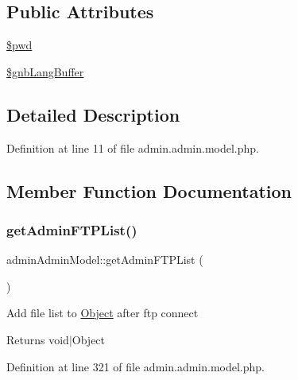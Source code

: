 \subsection*{Public Attributes}
\begin{DoxyCompactItemize}
\item 
\hyperlink{classadminAdminModel_a0c3f3a9ef22f7f5b6ed159a11d8d8e45}{\$pwd}
\item 
\hyperlink{classadminAdminModel_acd5e0dd59b6eb5c0df5638247797c799}{\$gnb\+Lang\+Buffer}
\end{DoxyCompactItemize}


\subsection{Detailed Description}


Definition at line 11 of file admin.\+admin.\+model.\+php.



\subsection{Member Function Documentation}
\hypertarget{classadminAdminModel_a9e944aba1586e011811993745738728e}{}\label{classadminAdminModel_a9e944aba1586e011811993745738728e} 
\subsubsection{\texorpdfstring{get\+Admin\+F\+T\+P\+List()}{getAdminFTPList()}}
{\footnotesize\ttfamily admin\+Admin\+Model\+::get\+Admin\+F\+T\+P\+List (\begin{DoxyParamCaption}{ }\end{DoxyParamCaption})}

Add file list to \hyperlink{classObject}{Object} after ftp connect \begin{DoxyReturn}{Returns}
void$\vert$\+Object 
\end{DoxyReturn}


Definition at line 321 of file admin.\+admin.\+model.\+php.

\hypertarget{classadminAdminModel_a155e29f18f17c6c657a457fcd65fd24b}{}\label{classadminAdminModel_a155e29f18f17c6c657a457fcd65fd24b} 
